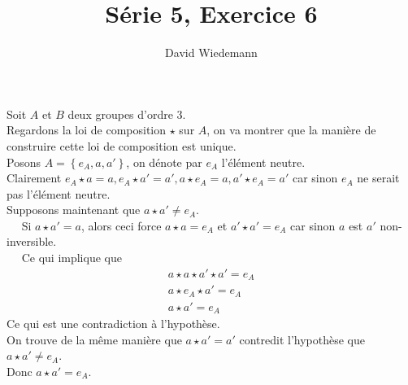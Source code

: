 \documentclass[11pt, a4paper, twoside]{article}
\begin{document}
\title{Série 5, Exercice 6}
\author{David Wiedemann}
\maketitle
Soit $A$ et $B$ deux groupes d'ordre 3.\\
Regardons la loi de composition $\star$ sur $A$, on va montrer que la manière de construire cette loi de composition est unique.\\

Posons $A= \left\{ e_A, a, a' \right\} $, on dénote par $e_A$ l'élément neutre.\\
Clairement $e_A \star a = a, e_A \star a'= a', a \star e_A = a, a' \star e_A = a'$ car sinon $e_A$ ne serait pas l'élément neutre.\\
Supposons maintenant que $a \star a' \neq e_A$.\\
$\quad$ Si $a \star a' = a$, alors ceci force $a \star a = e_A $ et $a' \star a' = e_A $ car sinon $a$ est $a'$ non-inversible.\\
$\quad$ Ce qui implique que
\begin{align*}
a \star a \star a' \star a' = e_A\\
a \star e_A \star a' = e_A\\
a \star a' = e_A
\end{align*}
Ce qui est une contradiction à l'hypothèse.\\

On trouve de la même manière que $a \star a' =a'$ contredit l'hypothèse que $a\star a'\neq e_A$.\\

Donc $a \star a' = e_A$.\\
\end{document}
